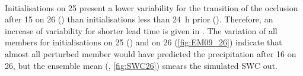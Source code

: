 \\
Initialisations on \SI{25}{\dec} present a lower variability for the transition of the occlusion after \SI{15}{\UTC} on \SI{26}{\dec}  () than initialisations less than \SI{24}{\hour} prior (). 
Therefore, an increase of variability for shorter lead time is given in . %
The variation of all members for initialisations on \SI{25}{\dec} () and on \SI{26}{\dec} (\ref{fig:EM09_26}) indicate that almost all perturbed member would have predicted the precipitation after \SI{16}{\UTC} on \SI{26}{\dec}, but the ensemble mean (, \ref{fig:SWC26}) smears the simulated SWC out. 
\\
